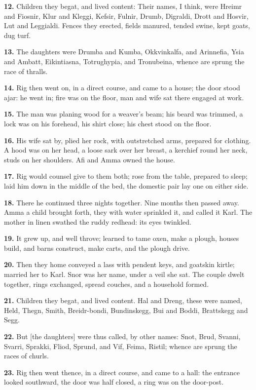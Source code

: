 \textbf{12.} Children they begat, and lived content: Their names, I think,
were Hreimr and Fiosnir, Klur and Kleggi, Kefsir, Fulnir, Drumb,
Digraldi, Drott and Hosvir, Lut and Leggialdi. Fences they erected,
fields manured, tended swine, kept goats, dug turf.

\textbf{13.} The daughters were Drumba and Kumba, Okkvinkalfa, and Arinnefia,
Ysia and Ambatt, Eikintiasna, Totrughypia, and Tronubeina, whence are
sprung the race of thralls.

\textbf{14.} Rig then went on, in a direct course, and came to a house; the
door stood ajar: he went in; fire was on the floor, man and wife sat
there engaged at work.

\textbf{15.} The man was planing wood for a weaver's beam; his beard was
trimmed, a lock was on his forehead, his shirt close; his chest stood
on the floor.

\textbf{16.} His wife sat by, plied her rock, with outstretched arms,
prepared for clothing. A hood was on her head, a loose sark over her
breast, a kerchief round her neck, studs on her shoulders. Afi and
Amma owned the house.

\textbf{17.} Rig would counsel give to them both; rose from the table,
prepared to sleep; laid him down in the middle of the bed, the
domestic pair lay one on either side.

\textbf{18.} There he continued three nights together. Nine months then
passed away. Amma a child brought forth, they with water sprinkled it,
and called it Karl. The mother in linen swathed the ruddy redhead: its
eyes twinkled.

\textbf{19.} It grew up, and well throve; learned to tame oxen, make a
plough, houses build, and barns construct, make carts, and the plough
drive.

\textbf{20.} Then they home conveyed a lass with pendent keys, and goatskin
kirtle; married her to Karl. Snor was her name, under a veil she sat.
The couple dwelt together, rings exchanged, spread couches, and a
household formed.

\textbf{21.} Children they begat, and lived content. Hal and Dreng, these
were named, Held, Thegn, Smith, Breidr-bondi, Bundinskegg, Bui and
Boddi, Brattskegg and Segg.

\textbf{22.} But [the daughters] were thus called, by other names: Snot,
Brud, Svanni, Svarri, Sprakki, Fliod, Sprund, and Vif, Feima, Ristil;
whence are sprung the races of churls.

\textbf{23.} Rig then went thence, in a direct course, and came to a hall:
the entrance looked southward, the door was half closed, a ring was on
the door-post.

